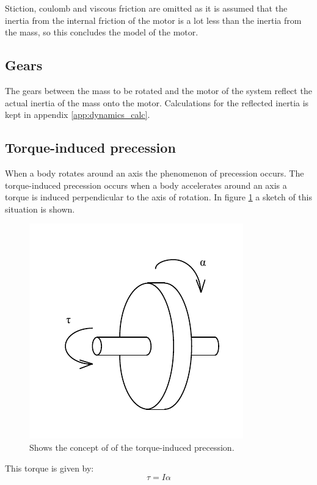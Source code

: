 Stiction, coulomb and viscous friction are omitted as it is assumed that the inertia from the internal friction of the motor is a lot less than the inertia from the mass, so this concludes the model of the motor.

\subsection{Gears}
The gears between the mass to be rotated and the motor of the system reflect the actual inertia of the mass onto the motor. Calculations for the reflected inertia is kept in appendix \ref{app:dynamics_calc}.
  
\subsection{Torque-induced precession}
When a body rotates around an axis the phenomenon of precession occurs. The torque-induced precession occurs when a body accelerates around an axis a torque is induced perpendicular to the axis of rotation. In figure \ref{fig:precession} a sketch of this situation is shown.
\begin{figure}[htb]
	\begin{center}
	\includegraphics[scale=1,trim=0 0 0 0]{graphics/precession.pdf} %
	\caption{Shows the concept of of the torque-induced precession.}
	\label{fig:precession}			%
	\end{center}
\end{figure}
This torque is given by:
\begin{equation}
	\tau = I\alpha\label{eq:induced_torque}
\end{equation}
